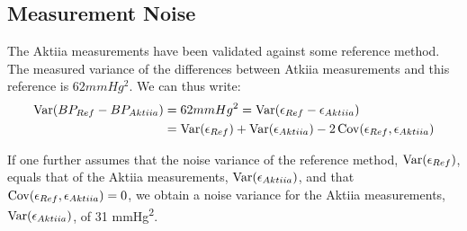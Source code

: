 \subsection{Measurement Noise}

The Aktiia measurements have been validated against some
reference method.
The measured variance of the differences between Atkiia measurements
and this reference is $62 mmHg^2$.
We can thus write:
\begin{align*}
    \operatorname{Var}(BP_{Ref} - BP_{Aktiia})
    & = 62 mmHg^2 = \operatorname{Var}(\epsilon_{Ref} - \epsilon_{Aktiia}) \\
    & = \operatorname{Var}(\epsilon_{Ref}) + \operatorname{Var}(\epsilon_{Aktiia}) - 2\operatorname{Cov}(\epsilon_{Ref},
    \epsilon_{Aktiia})
\end{align*}

If one further assumes that the noise variance of the reference method,
$\operatorname{Var}(\epsilon_{Ref})$, equals that of the Aktiia measurements, $\operatorname{Var}(\epsilon_{Aktiia})$,
and that $\operatorname{Cov}(\epsilon_{Ref}, \epsilon_{Aktiia})=0$, we obtain a noise variance
for the Aktiia measurements,
$\operatorname{Var}(\epsilon_{Aktiia})$, of 31 mmHg\textsuperscript{2}.




